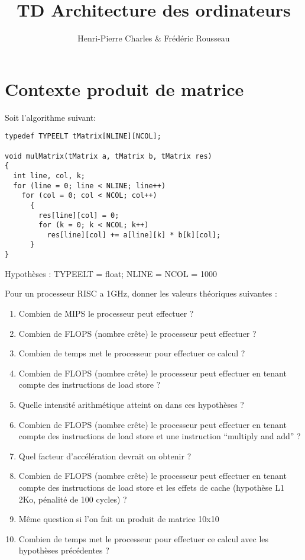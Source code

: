 \documentclass{article}
\title{TD Architecture des ordinateurs}
\author{Henri-Pierre Charles \& Frédéric Rousseau}
\begin{document}
\sffamily %
\allsectionsfont{\sffamily}
\maketitle
\section{Contexte produit de matrice}

Soit l'algorithme suivant: 
\begin{verbatim}
typedef TYPEELT tMatrix[NLINE][NCOL];

void mulMatrix(tMatrix a, tMatrix b, tMatrix res)
{
  int line, col, k;
  for (line = 0; line < NLINE; line++)
    for (col = 0; col < NCOL; col++)
      {
        res[line][col] = 0;
        for (k = 0; k < NCOL; k++)
          res[line][col] += a[line][k] * b[k][col];
      }
}
\end{verbatim}

Hypothèses : TYPEELT = float; NLINE = NCOL = 1000

Pour un processeur RISC a 1GHz, donner les valeurs théoriques
suivantes :

\begin{enumerate}
\item Combien de MIPS le processeur peut effectuer ?
\item Combien de FLOPS (nombre crête) le processeur peut effectuer ?
\item Combien de temps met le processeur pour effectuer ce calcul ?
\item Combien de FLOPS (nombre crête) le processeur peut effectuer
  en tenant compte des instructions de load store ?
\item Quelle intensité arithmétique atteint on dans ces hypothèses ?
\item Combien de FLOPS (nombre crête) le processeur peut effectuer en
  tenant compte des instructions de load store et une instruction
  ``multiply and add'' ?
\item Quel facteur d'accélération devrait on obtenir ?
\item Combien de FLOPS (nombre crête) le processeur peut effectuer
   en tenant compte des instructions de load store et les effets
   de cache (hypothèse L1 2Ko, pénalité de 100 cycles) ?
\item Même question si l'on fait un produit de matrice 10x10
 \item Combien de temps met le processeur pour effectuer ce calcul
   avec les hypothèses précédentes ?
\end{enumerate}
\newpage{}
\end{document}
